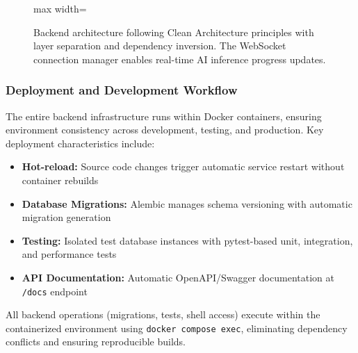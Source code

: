\begin{figure}[t]
\begin{adjustbox}{max width=\textwidth}
\end{adjustbox}
\caption{Backend architecture following Clean Architecture principles with layer separation and dependency inversion. The WebSocket connection manager enables real-time AI inference progress updates.}
\label{fig:backend-architecture}
\end{figure}

\subsubsection{Deployment and Development Workflow}

The entire backend infrastructure runs within Docker containers, ensuring environment consistency across development, testing, and production. Key deployment characteristics include:

\begin{itemize}
    \item \textbf{Hot-reload:} Source code changes trigger automatic service restart without container rebuilds
    \item \textbf{Database Migrations:} Alembic manages schema versioning with automatic migration generation
    \item \textbf{Testing:} Isolated test database instances with pytest-based unit, integration, and performance tests
    \item \textbf{API Documentation:} Automatic OpenAPI/Swagger documentation at \texttt{/docs} endpoint
\end{itemize}

All backend operations (migrations, tests, shell access) execute within the containerized environment using \texttt{docker compose exec}, eliminating dependency conflicts and ensuring reproducible builds.
